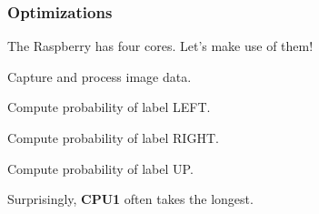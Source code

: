 \documentclass{beamer}
\begin{document}
\begin{frame}
  \frametitle{Optimizations}

  The Raspberry has four cores. Let's make use of them!

  \begin{description}[width=1cm]
    \item[CPU1:] Capture and process image data.
    \item[CPU2:] Compute probability of label LEFT.
    \item[CPU3:] Compute probability of label RIGHT.
    \item[CPU4:] Compute probability of label UP.
  \end{description}

  Surprisingly, \textbf{CPU1} often takes the longest.

\end{frame}
\end{document}
